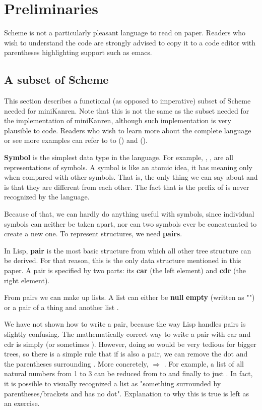 \section{Preliminaries}
\label{prelim}
Scheme is not a particularly pleasant language to read on paper.
Readers who wish to understand the code are strongly advised to copy it to a code editor with parentheses highlighting support such as emacs.

\subsection{A subset of Scheme}
This section describes a functional (as opposed to imperative) subset of Scheme needed for miniKanren. Note that this is not the same as the subset needed for the implementation of miniKanren, although such implementation is very plausible to code.
Readers who wish to learn more about the complete language or see more examples can refer to to (\cite{tspl4}) and (\cite{sicp}).

\textbf{Symbol} is the simplest data type in the language. For example, , ,  are all representations of symbols.
A symbol is like an atomic idea, it has meaning only when compared with other symbols. That is, the only thing we can say about  and  is that they are different from each other. The fact that  is the prefix of  is never recognized by the language.

Because of that, we can hardly do anything useful with symbols, since individual symbols can neither be taken apart, nor can two symbols ever be concatenated to create a new one. To represent structures, we need \textbf{pairs}.

In Lisp, \textbf{pair} is the most basic structure from which all other tree structure can be derived.
For that reason, this is the only data structure mentioned in this paper.
A pair is specified by two parts: its \textbf{car} (the left element) and \textbf{cdr} (the right element).

From pairs we can make up lists. A list can either be \textbf{null} \textbf{empty} (written as "\code{()}") or a pair of a thing  and another list .

We have not shown how to write a pair, because the way Lisp handles pairs is slightly confusing. The mathematically correct way to write a pair with car  and cdr  is simply  (or sometimes \code{[a . d]}).
However, doing so would be very tedious for bigger trees, so there is a simple rule that if  is also a pair, we can remove the dot and the parentheses surrounding . More concretely,  $\Rightarrow$ .
For example, a list of all natural numbers from 1 to 3 can be reduced from  to  and finally to just . In fact, it is possible to visually recognized a list as "something surrounded by parentheses/brackets and has no dot". Explanation to why this is true is left as an exercise.

